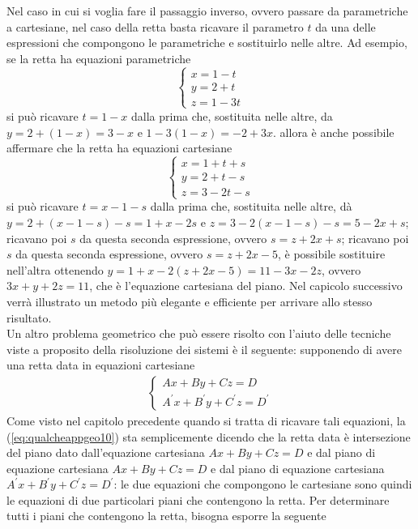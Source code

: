 \begin{oss}
  \label{oss:qualcheappgeo4}
  Nel caso in cui si voglia fare il passaggio inverso, ovvero passare da parametriche a cartesiane, nel
  caso della retta basta ricavare il parametro $t$ da una delle espressioni che compongono le
  parametriche e sostituirlo nelle altre. Ad esempio, se la retta ha equazioni parametriche
  \begin{equation*}
    \begin{cases}
      x=1-t\\
      y=2+t\\
      z=1-3t
    \end{cases}
  \end{equation*}
  si può ricavare $t=1-x$ dalla prima che, sostituita nelle altre, da $y=2+(1-x)=3-x$ e
  $1-3 (1-x)=-2+3x$. allora è anche possibile affermare che la retta ha equazioni cartesiane
  \begin{equation*}
    \begin{cases}
      x=1+t+s\\
      y=2+t-s\\
      z=3-2t-s
    \end{cases}
  \end{equation*}
  si può ricavare $t=x-1-s$ dalla prima che, sostituita nelle altre, dà $y=2+(x-1-s)-s=1+x-2s$ e
  $z=3-2(x-1-s)-s=5-2x+s$; ricavano poi $s$ da questa seconda espressione, ovvero $s=z+2x+s$; ricavano
  poi $s$ da questa seconda espressione, ovvero $s=z+2x-5$, è possibile sostituire nell'altra
  ottenendo $y=1+x-2(z+2x-5)=11-3x-2z$, ovvero $3x+y+2z=11$, che è l'equazione cartesiana del piano.
  Nel capicolo successivo verrà illustrato un metodo più elegante e efficiente per arrivare allo stesso
  risultato.\\
  Un altro problema geometrico che può essere risolto con l'aiuto delle tecniche viste a proposito della
  risoluzione dei sistemi è il seguente: supponendo di avere una retta data in equazioni cartesiane
  \begin{eqnarray}
    \label{eq:qualcheappgeo10}
    \begin{cases}
      Ax+By+Cz=D\\
      A^\prime x+B^\prime y+C^\prime z =D^\prime
    \end{cases}
  \end{eqnarray}
  Come visto nel capitolo precedente quando si tratta di ricavare tali equazioni, la
  (\ref{eq:qualcheappgeo10}) sta semplicemente dicendo che la retta data è intersezione del piano dato
  dall'equazione cartesiana $Ax+By+Cz=D$ e dal piano di equazione cartesiana $Ax+By+Cz=D$ e dal piano
  di equazione cartesiana $A^\prime x+B^\prime y+C^\prime z =D^\prime$: le due equazioni che compongono
  le cartesiane sono quindi le equazioni di due particolari piani che contengono la retta.
  Per determinare tutti i piani che contengono la retta, bisogna esporre la seguente
\end{oss}
